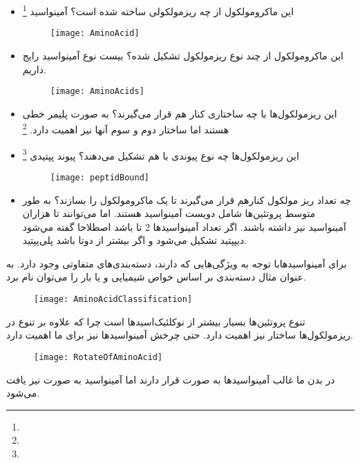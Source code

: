 \begin{itemize}
\item این ماکرومولکول از چه ریزمولکولی ساخته شده است؟ آمینواسید
\footnote{}
\begin{figure}[htbp]
\centering
\texttt{[image: AminoAcid]}
\end{figure}

\item این ماکرومولکول از چند نوع ریزمولکول تشکیل شده؟ بیست نوع آمینواسید رایج داریم.
\begin{figure}[htbp]
\centering
\texttt{[image: AminoAcids]}
\end{figure}

\item این ریزمولکول‌ها با چه ساختاری کنار هم قرار می‌گیرند؟ به صورت پلیمر خطی هستند اما ساختار دوم و سوم آنها نیز اهمیت دارد.
\footnote{}

\item این ریزمولکول‌ها چه نوع پیوندی با هم تشکیل می‌دهند؟ پیوند پپتیدی
\footnote{}
\begin{figure}[htbp]
\centering
\texttt{[image: peptidBound]}
\end{figure}

\item چه تعداد ریز مولکول کنارهم قرار می‌گیرند تا یک ماکرومولکول را بسازند؟ به طور متوسط پروتئین‌ها شامل دویست آمینواسید هستند. اما می‌توانند تا هزاران آمینواسید نیز داشته باشند. اگر تعداد آمینواسید‌ها 2 تا باشد اصطلاحا گفته مي‌شود دیپپتید تشکیل می‌شود و اگر بیشتر از دوتا باشد پلی‌پپتید.
\end{itemize}

برای آمینواسید‌هابا توجه به ویژگی‌هایی که دارند، دسته‌بندی‌های متفاوتی وجود دارد. به عنوان مثال دسته‌بندی بر اساس خواص شیمیایی و یا بار را می‌توان نام برد.

\begin{figure}[htbp]
\centering
\texttt{[image: AminoAcidClassification]}
\end{figure}

\pagebreak
تنوع پروتئین‌ها بسیار بیشتر از نوکلئیک‌اسید‌ها است چرا که علاوه بر تنوع در ریزمولکول‌ها ساختار نیز اهمیت دارد. حتی چرخش آمینواسید‌ها نیز برای ما اهمیت دارد.

\begin{figure}[htbp]
\centering
\texttt{[image: RotateOfAminoAcid]}
\end{figure}

در بدن ما غالب آمینواسید‌ها به صورت
قرار دارند اما
آمینواسید
به صورت
نیز یافت می‌شود.

